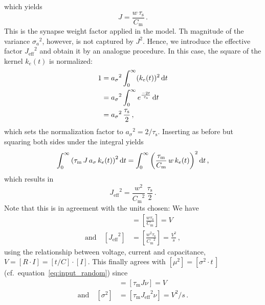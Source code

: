 which yields 
\begin{equation}
    J = \frac{w \, \tau_\text{s}}{C_\text{m}} \,.
    \label{eq:J_eff}
\end{equation}
This is the synapse weight factor applied in the model.
Th magnitude of the variance ${\sigma_a}^2$, however, is not
captured by $J^2$. 
Hence, we introduce the effective factor ${J_\text{eff}}^2$ and obtain it by an 
analogue procedure.
In this case, the square of the kernel $k_e(t)$ is normalized:%
\begin{equation}
    \begin{split}
        1   &= {a_\sigma}^2 \int_{0}^{\infty}(k_e(t))^2\mathop{}\!\text{d} t  \\
            &= {a_\sigma}^2 \int_{0}^{\infty} e^{\frac{-2t}{\tau_\text{s} }} \mathop{}\!\text{d} t  \\
            &= {a_\sigma}^2 \, \frac{\tau_\text{s} }{2}\,,
    \end{split}
    \label{eq:match_k_e_sq}
\end{equation}
which sets the normalization factor to ${a_\sigma}^2 = 2 / \tau_\text{s} $.
Inserting as before but squaring both sides under the integral yields
\begin{equation}
    \int_{0}^{\infty} \left(\tau_\text{m} \,J \,a_\sigma\, k_e(t)\right)^2 \mathop{}\!\text{d} t 
        = \int_{0}^{\infty} \left(\frac{\tau_\text{m} }{C_\text{m}} \,w\, k_e(t)\right)^2\mathop{}\!\text{d} t \,,
    \label{eq:match_syns}
\end{equation}
which results in 
\begin{equation}
    {J_\text{eff}}^2 =  \frac{w^2}{{C_\text{m}}^2} \,\frac{\tau_\text{s} }{2}  \, .
    \label{eq:J_eff}
\end{equation}
Note that this is in agreement with the units chosen: We have
\begin{align}
    [J] 
        &=  \left[ \frac{w \tau_\text{s} }{C_\text{m}}\right] 
        = V \\
    \text{and}\quad 
    \left[ {J_\text{eff}}^2  \right] 
        &=  \left[ \frac{w^2 \tau_\text{s}}{{C_\text{m}}^2} \right] 
    =  \frac{V^2}{s}  \,,
    \label{eq:units}
\end{align}
using the relationship between voltage, current and capacitance, $V = [R\cdot I] = [t / C]\cdot[I]$.
This finally agrees with $[\mu^2] = [\sigma^2 \cdot t\,]$ (cf.~equation~\eqref{eq:input_random}) since
\begin{align}   
    [\mu] &= [\tau_\text{m} J \nu] = V \\
    \text{and}\quad 
    [\sigma^2] &= [\tau_\text{m} {J_\text{eff}}^2  \nu] = V^2 / s  \,.
    \label{eq:units_res}
\end{align}

